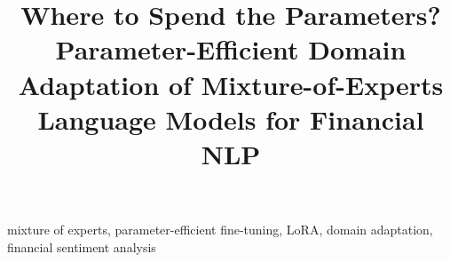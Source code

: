 \documentclass[conference]{IEEEtran}
\begin{document}
\title{Where to Spend the Parameters? Parameter-Efficient Domain Adaptation of Mixture-of-Experts Language Models for Financial NLP}

\author{
}

\maketitle

\begin{abstract}

\end{abstract}

\begin{IEEEkeywords}
mixture of experts, parameter-efficient fine-tuning, LoRA, domain adaptation, financial sentiment analysis
\end{IEEEkeywords}










\end{document}
